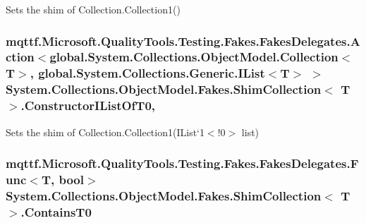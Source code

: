 Sets the shim of Collection{.\-Collection}1()

\hypertarget{class_system_1_1_collections_1_1_object_model_1_1_fakes_1_1_shim_collection_3_01_t_01_4_aa83204ce51c4215a39adcf9ea0ca1868}{
\subsubsection[{Constructor\-I\-List\-Of\-T0}]{\setlength{\rightskip}{0pt plus 5cm}mqttf.\-Microsoft.\-Quality\-Tools.\-Testing.\-Fakes.\-Fakes\-Delegates.\-Action$<$global.\-System.\-Collections.\-Object\-Model.\-Collection$<$T$>$, global.\-System.\-Collections.\-Generic.\-I\-List$<$T$>$ $>$ System.\-Collections.\-Object\-Model.\-Fakes.\-Shim\-Collection$<$ T $>$.Constructor\-I\-List\-Of\-T0\hspace{0.3cm}{\ttfamily [static]}, {\ttfamily [set]}}}\label{class_system_1_1_collections_1_1_object_model_1_1_fakes_1_1_shim_collection_3_01_t_01_4_aa83204ce51c4215a39adcf9ea0ca1868}


Sets the shim of Collection{.\-Collection}1(I\-List`1$<$!0$>$ list)

\hypertarget{class_system_1_1_collections_1_1_object_model_1_1_fakes_1_1_shim_collection_3_01_t_01_4_a3749c5ef7db585ec7a8f79ba413cd1cf}{
\subsubsection[{Contains\-T0}]{\setlength{\rightskip}{0pt plus 5cm}mqttf.\-Microsoft.\-Quality\-Tools.\-Testing.\-Fakes.\-Fakes\-Delegates.\-Func$<$T, bool$>$ System.\-Collections.\-Object\-Model.\-Fakes.\-Shim\-Collection$<$ T $>$.Contains\-T0\hspace{0.3cm}{\ttfamily [set]}}}\label{class_system_1_1_collections_1_1_object_model_1_1_fakes_1_1_shim_collection_3_01_t_01_4_a3749c5ef7db585ec7a8f79ba413cd1cf}


